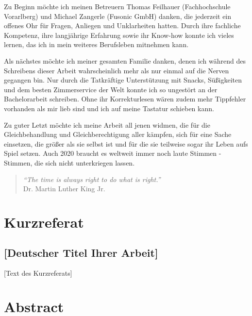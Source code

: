 \documentclass[a4paper,12pt,twoside]{scrreprt}
\begin{document}
\medskip

Zu Beginn möchte ich meinen Betreuern Thomas Feilhauer (Fachhochschule Vorarlberg) und Michael Zangerle (Fusonic GmbH) danken, die jederzeit ein offenes Ohr für Fragen, Anliegen und Unklarheiten hatten. Durch ihre fachliche Kompetenz, ihre langjährige Erfahrung sowie ihr Know-how konnte ich vieles lernen, das ich in mein weiteres Berufsleben mitnehmen kann.

\medskip

Als nächstes möchte ich meiner gesamten Familie danken, denen ich während des Schreibens dieser Arbeit wahrscheinlich mehr als nur einmal auf die Nerven gegangen bin. Nur durch die Tatkräftige Unterstützung mit Snacks, Süßigkeiten und dem besten Zimmerservice der Welt konnte ich so ungestört an der Bachelorarbeit schreiben. Ohne ihr Korrekturlesen wären zudem mehr Tippfehler vorhanden als mir lieb sind und ich auf meine Tastatur schieben kann.

\medskip

Zu guter Letzt möchte ich meine Arbeit all jenen widmen, die für die Gleichbehandlung und Gleichberechtigung aller kämpfen, sich für eine Sache einsetzen, die größer als sie selbst ist und für die sie teilweise sogar ihr Leben aufs Spiel setzen. Auch 2020 braucht es weltweit immer noch laute Stimmen - Stimmen, die sich nicht unterkriegen lassen.

\bigskip

\begin{quote}
    \begin{flushright}
        \textit{\enquote{The time is always right to do what is right.}}\\
        Dr. Martin Luther King Jr.
    \end{flushright}
\end{quote}

\newpage
\section*{Kurzreferat}
\label{sec:kurzreferat}

\subsection*{[Deutscher Titel Ihrer Arbeit]}

[Text des Kurzreferats]

\newpage
\section*{Abstract}
\label{sec:abstract}
\end{document}

